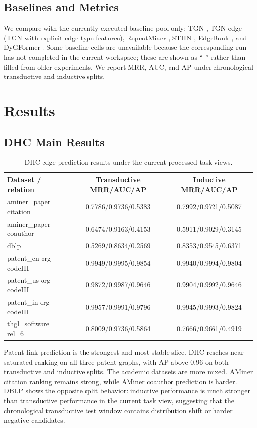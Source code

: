 \documentclass[runningheads]{llncs}
\begin{document}
\subsection{Baselines and Metrics}
We compare with the currently executed baseline pool only: TGN \cite{rossi2020tgn}, TGN-edge (TGN with explicit edge-type features), RepeatMixer \cite{zou2024repeatmixer}, STHN \cite{li2023sthn}, EdgeBank \cite{huang2023tgb}, and DyGFormer \cite{yu2023dygformer}. Some baseline cells are unavailable because the corresponding run has not completed in the current workspace; these are shown as ``-'' rather than filled from older experiments. We report MRR, AUC, and AP under chronological transductive and inductive splits.

\section{Results}
\subsection{DHC Main Results}
\begin{table}[t]
\centering
\caption{DHC edge prediction results under the current processed task views.}
\label{tab:dhc_main}
\scriptsize
\setlength{\tabcolsep}{3pt}
\begin{tabular}{lcc}
\toprule
Dataset / relation & Transductive MRR/AUC/AP & Inductive MRR/AUC/AP \\
\midrule
aminer\_paper citation & 0.7786/0.9736/0.5383 & 0.7992/0.9721/0.5087 \\
aminer\_paper coauthor & 0.6474/0.9163/0.4153 & 0.5911/0.9029/0.3145 \\
dblp & 0.5269/0.8634/0.2569 & 0.8353/0.9545/0.6371 \\
patent\_cn org-codeIII & 0.9949/0.9995/0.9854 & 0.9940/0.9994/0.9804 \\
patent\_us org-codeIII & 0.9872/0.9987/0.9646 & 0.9904/0.9992/0.9646 \\
patent\_in org-codeIII & 0.9957/0.9991/0.9796 & 0.9945/0.9993/0.9824 \\
thgl\_software rel\_6 & 0.8009/0.9736/0.5864 & 0.7666/0.9661/0.4919 \\
\bottomrule
\end{tabular}
\end{table}

Patent link prediction is the strongest and most stable slice. DHC reaches near-saturated ranking on all three patent graphs, with AP above 0.96 on both transductive and inductive splits. The academic datasets are more mixed. AMiner citation ranking remains strong, while AMiner coauthor prediction is harder. DBLP shows the opposite split behavior: inductive performance is much stronger than transductive performance in the current task view, suggesting that the chronological transductive test window contains distribution shift or harder negative candidates.
\end{document}
